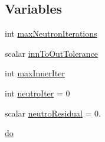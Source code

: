 \subsection*{Variables}
\begin{DoxyCompactItemize}
\item 
int \hyperlink{solveNeutronicsSN_8H_aeeb27a033c3d21cdfe4cc47565bc21a2}{max\+Neutron\+Iterations}
\item 
scalar \hyperlink{solveNeutronicsSN_8H_a8c0b13ecc43157dd3e8ea513fe3139a4}{inn\+To\+Out\+Tolerance}
\item 
int \hyperlink{solveNeutronicsSN_8H_a9dc3825181b46ae33ccfa3afd2182700}{max\+Inner\+Iter}
\item 
int \hyperlink{solveNeutronicsSN_8H_a5ea48e0170faff29dfdd3cbba330d51d}{neutro\+Iter} = 0
\item 
scalar \hyperlink{solveNeutronicsSN_8H_a2a3baa00ecfd5a47c6f6ba475a66d2c6}{neutro\+Residual} = 0.
\item 
\hyperlink{solveNeutronicsSN_8H_a721c6ff80a6d3e4ad4ffa52a04c60085}{do}
\end{DoxyCompactItemize}


